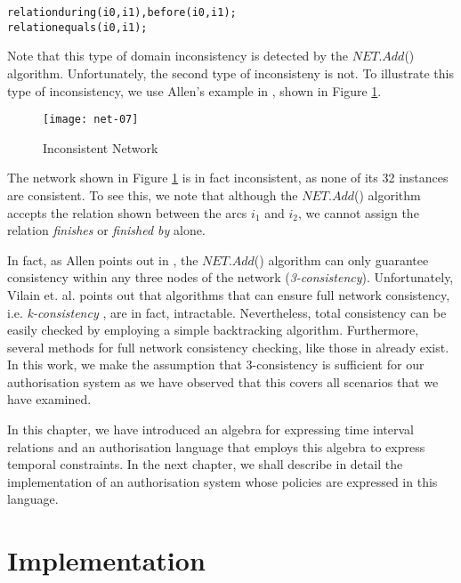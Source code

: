 \documentclass[11pt]{report}
\newenvironment{vverbatim}
{
  \begin{alltt}
}
{
    \vspace{-\baselineskip}
  \end{alltt}
}
\begin{document}
      \begin{vverbatim}
  relation during(i0, i1), before(i0, i1);
  relation equals(i0, i1);
      \end{vverbatim}

      Note that this type of domain inconsistency is detected by the
      $NET.Add$() algorithm. Unfortunately, the second type of inconsisteny is
      not. To illustrate this type of inconsistency, we use Allen's example in
      \cite{AL}, shown in Figure \ref{fig-net-ex-07}.

      \begin{figure}[[tbhp]
        \begin{center}
          \texttt{[image: net-07]}
          \caption{Inconsistent Network}
          \label{fig-net-ex-07}
        \end{center}
      \end{figure}

      The network shown in Figure \ref{fig-net-ex-07} is in fact inconsistent,
      as none of its 32 instances are consistent. To see this, we note that
      although the $NET.Add$() algorithm accepts the relation shown between the
      arcs $i_1$ and $i_2$, we cannot assign the relation {\em finishes} or
      {\em finished by} alone.

      In fact, as Allen points out in \cite{AL}, the $NET.Add$() algorithm can
      only guarantee consistency within any three nodes of the network
      ({\em 3-consistency}). Unfortunately, Vilain et. al. \cite{VI} points out
      that algorithms that can ensure full network consistency, i.e.
      {\em k-consistency} \cite{FR}, are in fact, intractable. Nevertheless,
      total consistency can be easily checked by employing a simple
      backtracking algorithm. Furthermore, several methods for full network
      consistency checking, like those in \cite{LA,VB} already exist. In this
      work, we make the assumption that 3-consistency is sufficient for our
      authorisation system as we have observed that this covers all scenarios
      that we have examined.

      In this chapter, we have introduced an algebra for expressing time
      interval relations and an authorisation language that employs this
      algebra to express temporal constraints. In the next chapter, we shall
      describe in detail the implementation of an authorisation system whose
      policies are expressed in this language.

  \chapter{Implementation}
\end{document}
